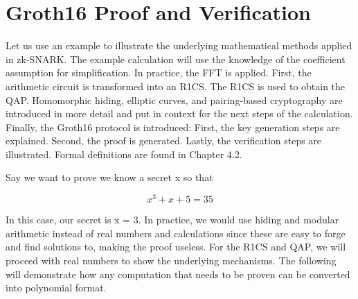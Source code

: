 \section{Groth16 Proof and Verification}
Let us use an example to illustrate the underlying mathematical methods applied in zk-SNARK. The example calculation will use the knowledge of the coefficient assumption for simplification. In practice, the FFT is applied. First, the arithmetic circuit is transformed into an R1CS. The R1CS is used to obtain the QAP. Homomorphic hiding, elliptic curves, and pairing-based cryptography are introduced in more detail and put in context for the next steps of the calculation. Finally, the Groth16 protocol is introduced: First, the key generation steps are explained. Second, the proof is generated. Lastly, the verification steps are illustrated. Formal definitions are found in Chapter 4.2.

Say we want to prove we know a secret x so that

\[x^3 + x + 5 = 35\]

In this case, our secret is x = 3.
In practice, we would use hiding and modular arithmetic instead of real numbers and calculations since these are easy to forge and find solutions to, making the proof useless. For the R1CS and QAP, we will proceed with real numbers to show the underlying mechanisms. The following will demonstrate how any computation that needs to be proven can be converted into polynomial format.


